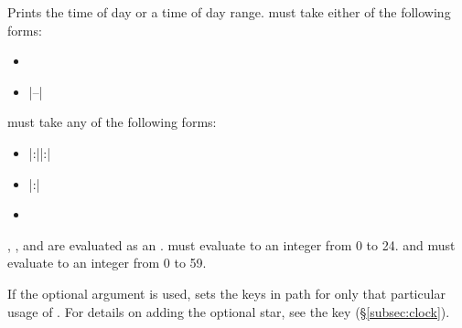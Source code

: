 \documentclass{beery}
\begin{document}
\begin{function}{\clock}
  \begin{syntax}
     \sarg{}  
  \end{syntax}
  Prints the time of day or a time of day range.
   must take either of the following forms:
  \begin{itemize}
    \item {}
    \item {}|--|
  \end{itemize}

   must take any of the following forms:
  \begin{itemize}
    \item {}|:||:|
    \item {}|:|
    \item {}
  \end{itemize}

  , , and  are evaluated as an .
   must evaluate to an integer from \num{0} to \num{24}.
   and  must evaluate to an integer from \num{0} to \num{59}.

  If the optional argument is used,  sets the keys in path  for only that particular usage of .
  For details on adding the optional star, see the key  (\S\ref{subsec:clock}).
\end{function}
\end{document}
